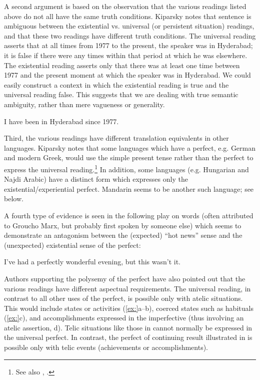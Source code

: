 A second argument is based on the observation that the various readings listed above do not all have the same truth conditions. Kiparsky notes that sentence  is ambiguous between the existential vs. universal (or persistent situation) readings, and that these two readings have different truth conditions. The universal reading asserts that at all times from 1977 to the present, the speaker was in Hyderabad; it is false if there were any times within that period at which he was elsewhere. The existential reading asserts only that there was at least one time between 1977 and the present moment at which the speaker was in Hyderabad. We could easily construct a context in which the existential reading is true and the universal reading false. This suggests that we are dealing with true semantic ambiguity, rather than mere vagueness or generality.


\ea
I have been in Hyderabad since 1977.
\z


Third, the various readings have different translation equivalents in other languages. Kiparsky notes that some languages which have a perfect, e.g. German and modern Greek, would use the simple present tense rather than the perfect to express the universal reading.\footnote{See also \citet{Comrie1976}, \citet{Klein2009}.} In addition, some languages (e.g. Hungarian and Najdi Arabic) have a distinct form which expresses only the existential/experiential perfect. Mandarin seems to be another such language; see  below.



A fourth type of evidence is seen in the following play on words (often attributed to Groucho Marx, but probably first spoken by someone else) which seems to demonstrate an antagonism between the (expected) “hot news” sense and the (unexpected) existential sense of the perfect:


\ea
I’ve had a perfectly wonderful evening, but this wasn’t it.
\z


Authors supporting the polysemy of the perfect have also pointed out that the various readings have different aspectual requirements. The universal reading, in contrast to all other uses of the perfect, is possible only with atelic situations. This would include states or activities (\ref{ex:}a--b), coerced states such as habituals (\ref{ex:}c), and accomplishments expressed in the imperfective (thus involving an atelic assertion, d). Telic situations like those in  cannot normally be expressed in the universal perfect. In contrast, the perfect of continuing result illustrated in  is possible only with telic events (achievements or accomplishments).



